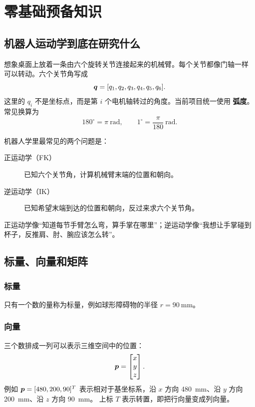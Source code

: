 \chapter{零基础预备知识}

\section{机器人运动学到底在研究什么}

想象桌面上放着一条由六个旋转关节连接起来的机械臂。每个关节都像门轴一样
可以转动。六个关节角写成
\[
\boldsymbol{q}=[q_1,q_2,q_3,q_4,q_5,q_6].
\]
这里的 $q_i$ 不是坐标点，而是第 $i$ 个电机轴转过的角度。当前项目统一使用
\textbf{弧度}。常见换算为
\[
180^\circ=\pi\ \mathrm{rad},\qquad
1^\circ=\frac{\pi}{180}\ \mathrm{rad}.
\]

机器人学里最常见的两个问题是：

\begin{description}
  \item[正运动学（FK）] 已知六个关节角，计算机械臂末端的位置和朝向。
  \item[逆运动学（IK）] 已知希望末端到达的位置和朝向，反过来求六个关节角。
\end{description}

正运动学像“知道每节手臂怎么弯，算手掌在哪里”；逆运动学像“我想让手掌碰到
杯子，反推肩、肘、腕应该怎么转”。

\section{标量、向量和矩阵}

\subsection{标量}

只有一个数的量称为标量，例如球形障碍物的半径 $r=90\ \mathrm{mm}$。

\subsection{向量}

三个数排成一列可以表示三维空间中的位置：
\[
\boldsymbol{p}=
\begin{bmatrix}x\\y\\z\end{bmatrix}.
\]
例如 $\boldsymbol{p}=[480,200,90]^T$ 表示相对于基坐标系，沿 $x$ 方向
\SI{480}{mm}、沿 $y$ 方向 \SI{200}{mm}、沿 $z$ 方向 \SI{90}{mm}。
上标 $T$ 表示转置，即把行向量变成列向量。

